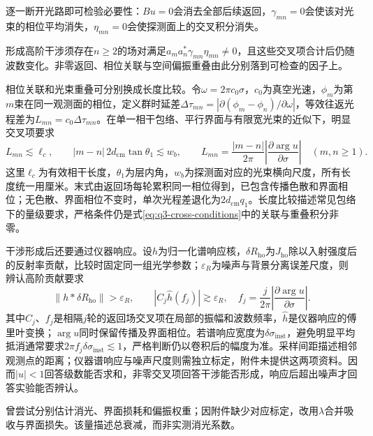 逐一断开光路即可检验必要性：$Bu=0$会消去全部后续返回，$\gamma_{mn}=0$会使该对光束的相位平均消失，$\eta_{mn}=0$会使探测面上的交叉积分消失。

形成高阶干涉须存在$n\geq2$的场对满足$a_ma_n^*\gamma_{mn}\eta_{mn}\ne0$，且这些交叉项合计后仍随波数变化。非零返回、相位关联与空间偏振重叠由此分别落到可检查的因子上。

相位关联和光束重叠可分别换成长度比较。令$\omega=2\pi c_0\sigma$，$c_0$为真空光速，$\phi_m$为第$m$束在同一观测面的相位，定义群时延差$\Delta\tau_{mn}=|\partial(\phi_m-\phi_n)/\partial\omega|$，等效往返光程差为$L_{mn}=c_0\Delta\tau_{mn}$。在单一相干包络、平行界面与有限宽光束的近似下，明显交叉项要求
\begin{equation}
L_{mn}\lesssim\ell_c,\qquad
|m-n|\,2d_{\mathrm{cm}}\tan\theta_1\lesssim w_b,\qquad
L_{mn}=\frac{|m-n|}{2\pi}\left|\frac{\partial\arg u}{\partial\sigma}\right|\quad(m,n\geq1).
\label{eq:q3-coherence-overlap}
\end{equation}
这里$\ell_c$为有效相干长度，$\theta_1$为层内角，$w_b$为探测面对应的光束横向尺度，所有长度统一用厘米。末式由返回场每轮累积同一相位得到，已包含传播色散和界面相位；无色散、界面相位不变时，单次光程差退化为$2d_{\mathrm{cm}}q_1$。长度比较描述常见包络下的量级要求，严格条件仍是式\eqref{eq:q3-cross-conditions}中的关联与重叠积分非零。

干涉形成后还要通过仪器响应。设$h$为归一化谱响应核，$\delta R_{\mathrm{ho}}$为$J_{\mathrm{ho}}$除以入射强度后的反射率贡献，比较时固定同一组光学参数；$\varepsilon_R$为噪声与背景分离误差尺度，则辨认高阶贡献要求
\begin{equation}
\|h*\delta R_{\mathrm{ho}}\|>\varepsilon_R,\qquad
|C_j\widehat h(f_j)|\gtrsim\varepsilon_R,\quad
f_j=\frac{j}{2\pi}\left|\frac{\partial\arg u}{\partial\sigma}\right|.
\label{eq:q3-resolution}
\end{equation}
其中$C_j$、$f_j$是相隔$j$轮的返回场交叉项在局部的振幅和波数频率，$\widehat h$是仪器响应的傅里叶变换；$\arg u$同时保留传播及界面相位。若谱响应宽度为$\delta\sigma_{\mathrm{inst}}$，避免明显平均抵消通常要求$2\pi f_j\delta\sigma_{\mathrm{inst}}\lesssim1$，严格判断仍以卷积后的幅度为准。采样间距描述相邻观测点的距离；仪器谱响应与噪声尺度则需独立标定，附件未提供这两项资料。因而$|u|<1$回答级数能否求和，非零交叉项回答干涉能否形成，响应后超出噪声才回答实验能否辨认。

曾尝试分别估计消光、界面损耗和偏振权重；因附件缺少对应标定，改用$\lambda$合并吸收与界面损失。该量描述总衰减，而非实测消光系数。

